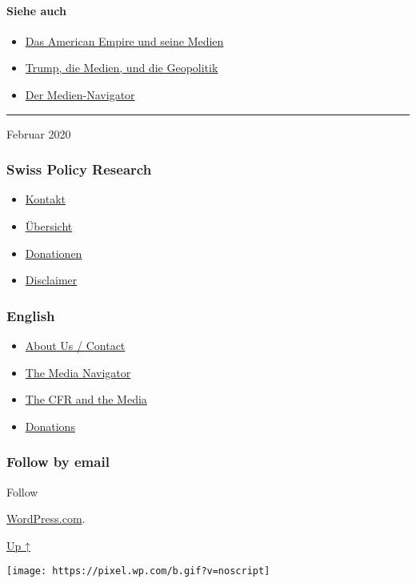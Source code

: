 \hypertarget{siehe-auch}{%
\paragraph{Siehe auch}\label{siehe-auch}}

\begin{itemize}
\tightlist
\item
  \href{https://swprs.org/das-american-empire-und-seine-medien/}{Das
  American Empire und seine Medien}
\item
  \href{https://swprs.org/trump-medien-geopolitik/}{Trump, die Medien,
  und die Geopolitik}
\item
  \href{https://swprs.org/medien-navigator/}{Der Medien-Navigator}
\end{itemize}

\begin{center}\rule{0.5\linewidth}{\linethickness}\end{center}

Februar 2020

\hypertarget{swiss-policy-research}{%
\subsubsection{Swiss Policy Research}\label{swiss-policy-research}}

\begin{itemize}
\tightlist
\item
  \href{https://swprs.org/kontakt/}{Kontakt}
\item
  \href{https://swprs.org/uebersicht/}{Übersicht}
\item
  \href{https://swprs.org/donationen/}{Donationen}
\item
  \href{https://swprs.org/disclaimer/}{Disclaimer}
\end{itemize}

\hypertarget{english}{%
\subsubsection{English}\label{english}}

\begin{itemize}
\tightlist
\item
  \href{https://swprs.org/contact/}{About Us / Contact}
\item
  \href{https://swprs.org/media-navigator/}{The Media Navigator}
\item
  \href{https://swprs.org/the-american-empire-and-its-media/}{The CFR
  and the Media}
\item
  \href{https://swprs.org/donations/}{Donations}
\end{itemize}

\hypertarget{follow-by-email}{%
\subsubsection{Follow by email}\label{follow-by-email}}

Follow

\href{https://wordpress.com/?ref=footer_custom_com}{WordPress.com}.

\protect\hyperlink{}{Up ↑}

\texttt{[image: https://pixel.wp.com/b.gif?v=noscript]}
